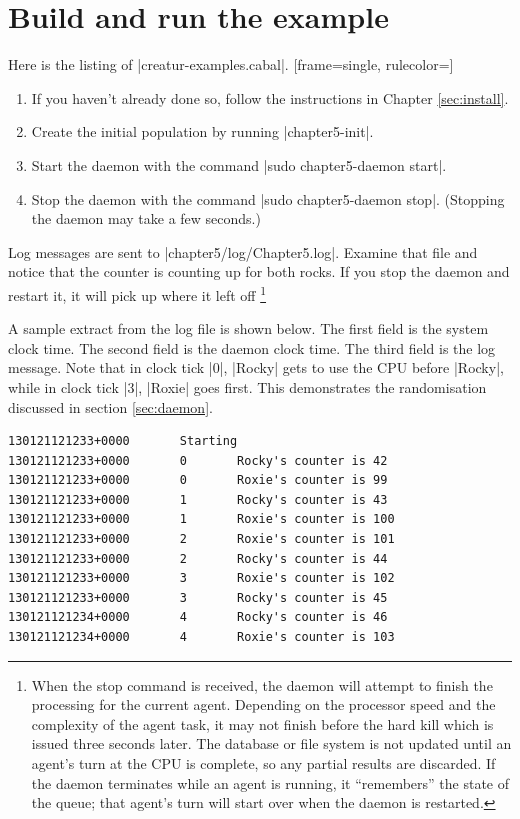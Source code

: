 \documentclass[a4paper,10pt]{report}
\begin{document}


\section{Build and run the example}
\label{sec:run1}


Here is the listing of |creatur-examples.cabal|.
[frame=single, rulecolor=\color{frame_color}]

\begin{enumerate}
\item If you haven't already done so, follow the instructions in Chapter
\ref{sec:install}.
\item Create the initial population by running |chapter5-init|.
\item Start the daemon with the command |sudo chapter5-daemon start|.
\item Stop the daemon with the command |sudo chapter5-daemon stop|.
(Stopping the daemon may take a few seconds.)
\end{enumerate}

Log messages are sent to |chapter5/log/Chapter5.log|.
Examine that file and notice that the counter is counting up for both rocks.
If you stop the daemon and restart it, it will pick up where it left off
\footnote{When the stop command is received, the daemon will attempt
to finish the processing for the current agent.
Depending on the processor speed and the complexity of the agent task,
it may not finish before the hard kill which is issued three seconds later.
The database or file system is not updated until an agent's turn at the CPU 
is complete, so any partial results are discarded.
If the daemon terminates while an agent is running,
it ``remembers'' the state of the queue;
that agent's turn will start over when the daemon is restarted.}

A sample extract from the log file is shown below.
The first field is the system clock time.
The second field is the daemon clock time.
The third field is the log message.
Note that in clock tick |0|, |Rocky| gets to use the CPU before |Rocky|,
while in clock tick |3|, |Roxie| goes first.
This demonstrates the randomisation discussed in section \ref{sec:daemon}.

\begin{verbatim}
130121121233+0000       Starting
130121121233+0000       0       Rocky's counter is 42
130121121233+0000       0       Roxie's counter is 99
130121121233+0000       1       Rocky's counter is 43
130121121233+0000       1       Roxie's counter is 100
130121121233+0000       2       Roxie's counter is 101
130121121233+0000       2       Rocky's counter is 44
130121121233+0000       3       Roxie's counter is 102
130121121233+0000       3       Rocky's counter is 45
130121121234+0000       4       Rocky's counter is 46
130121121234+0000       4       Roxie's counter is 103
\end{verbatim}
\end{document}
